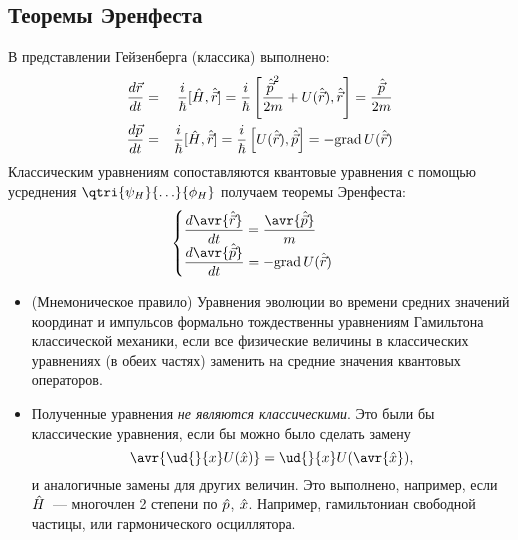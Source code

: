 \subsection{Теоремы Эренфеста}
В представлении Гейзенберга (классика) выполнено:
\begin{eqnarray}
        \dfrac{d\vec r}{dt} &=& \dfrac{i}{\hbar} [\hat H, \hat{\vec r}]
        = \dfrac{i}{\hbar} \left[ \dfrac{{\Hat{\vec p}}^2}{2m} + U(\Hat{\vec r} ), \Hat {\vec r}  \right]
        = \dfrac{\Hat{\vec p}}{2m} \\
        \dfrac{d\vec p}{dt} &=& \dfrac{i}{\hbar} [\hat H, \hat{\vec r}]
        = \dfrac{i}{\hbar} \left[ U(\Hat{\vec r}), \Hat {\Vec p}  \right]
        = - \mathrm{grad}\, U(\Hat{\vec{r}})
\end{eqnarray}
Классическим уравнениям сопоставляются квантовые уравнения с помощью усреднения $\qtri{\psi_H}{\ldots}{\phi_H}$
получаем теоремы Эренфеста:
$$
    \begin{cases}
        \dfrac{d \avr{\Hat{\vec r}}}{dt} = \dfrac{\avr{\Hat{\vec p}}}{m}\\
        \dfrac{d \avr{\Hat{\vec p}}}{dt} =  - \mathrm{grad}\, U(\Hat{\vec r})
    \end{cases}
$$
\Rem
\begin{itemize}
  \item (Мнемоническое правило) Уравнения эволюции во времени средних значений координат и импульсов формально тождественны уравнениям Гамильтона классической механики, если все физические величины в классических уравнениях (в обеих частях) заменить на средние значения квантовых операторов.
  \item Полученные уравнения \emph{не являются классическими}. Это были бы классические уравнения, если бы можно было сделать замену
      $$
        \avr{ \ud{}{x} U(\Hat x) } = \ud{}{x} U( \avr{\Hat x} ),
      $$
      и аналогичные замены для других величин. Это выполнено, например, если $\Hat H$~--- многочлен 2 степени по $\Hat p$, $\Hat x$. Например, гамильтониан свободной частицы, или гармонического осциллятора.
\end{itemize}
